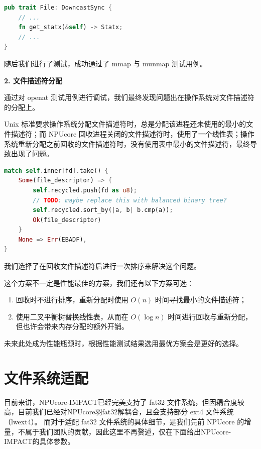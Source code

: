 \begin{lstlisting}[language={Rust}, caption={statx 系统调用实现}]
pub trait File: DowncastSync {
    // ...
    fn get_statx(&self) -> Statx;
    // ...
}
\end{lstlisting}

随后我们进行了测试，成功通过了 mmap 与 munmap 测试用例。

\textbf{2. 文件描述符分配}

通过对 openat 测试用例进行调试，我们最终发现问题出在操作系统对文件描述符的分配上。

Unix 标准要求操作系统分配文件描述符时，总是分配该进程还未使用的最小的文件描述符；而 NPUcore 回收进程关闭的文件描述符时，使用了一个线性表；操作系统重新分配之前回收的文件描述符时，没有使用表中最小的文件描述符，最终导致出现了问题。

\begin{lstlisting}[language={Rust}, caption={回收文件描述符}]
match self.inner[fd].take() {
    Some(file_descriptor) => {
        self.recycled.push(fd as u8);
        // TODO: maybe replace this with balanced binary tree?
        self.recycled.sort_by(|a, b| b.cmp(a));
        Ok(file_descriptor)
    }
    None => Err(EBADF),
}
\end{lstlisting}

我们选择了在回收文件描述符后进行一次排序来解决这个问题。

这个方案不一定是性能最佳的方案，我们还有以下方案可选：

\begin{enumerate}
    \item 回收时不进行排序，重新分配时使用 $O(n)$ 时间寻找最小的文件描述符；
    \item 使用二叉平衡树替换线性表，从而在 $O(\log n)$ 时间进行回收与重新分配，但也许会带来内存分配的额外开销。
\end{enumerate}

未来此处成为性能瓶颈时，根据性能测试结果选用最优方案会是更好的选择。

\section{文件系统适配}

目前来讲，NPUcore-IMPACT已经完美支持了 fat32 文件系统，但因耦合度较高，目前我们已经对NPUcore羽fat32解耦合，且会支持部分 ext4 文件系统（lwext4）。
而对于适配 fat32 文件系统的具体细节，是我们先前 NPUcore 的增量，不属于我们团队的贡献，因此这里不再赘述，仅在下面给出NPUcore-IMPACT的具体参数。

